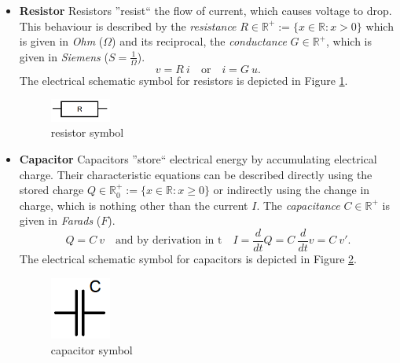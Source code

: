 \begin{itemize}
	\item \textbf{Resistor} \newline
	Resistors ''resist`` the flow of current, which causes voltage to drop. This behaviour is described by the \emph{resistance} $R \in \mathbb{R}^+ := \{x \in \mathbb{R}: x > 0\}$ which is given in \emph{Ohm} ($\Omega$) and its reciprocal, the \emph{conductance} $G \in \mathbb{R}^+$, which is given in \emph{Siemens} ($S=\frac{1}{\Omega}$). 
	\begin{equation}
		\label{eq:resistor law}
		v = R \ i \quad \text{or} \quad i = G \ u.
	\end{equation}
	The electrical schematic symbol for resistors is depicted in Figure \ref{fig:resistor symbol}.
	\begin{figure}[H]
		\label{fig:resistor symbol}
		\centering
		\includegraphics[width=2cm]{pictures/resistor.png}
		\caption{resistor symbol}
	\end{figure}

	\item \textbf{Capacitor} \newline
	Capacitors ''store`` electrical energy by accumulating electrical charge. Their characteristic equations can be described directly using the stored charge $Q \in \mathbb{R}^+_0 := \{x \in \mathbb{R}: x \geq 0\}$ or indirectly using the change in charge, which is nothing other than the current $I$. The \emph{capacitance} $C \in \mathbb{R}^+$ is given in \emph{Farads} ($F$).
	\begin{equation}
		\label{eq:capacitor law}
		Q = C \ v \quad \text{and by derivation in t} \quad I = \frac{d}{dt}Q = C \ \frac{d}{dt}v = C \ v'.
	\end{equation}
	The electrical schematic symbol for capacitors is depicted in Figure \ref{fig:capacitor symbol}.
	\begin{figure}[H]
		\label{fig:capacitor symbol}
		\centering
		\includegraphics[width=2cm]{pictures/capacitor.png}
		\caption{capacitor symbol}
	\end{figure}


\end{itemize}
